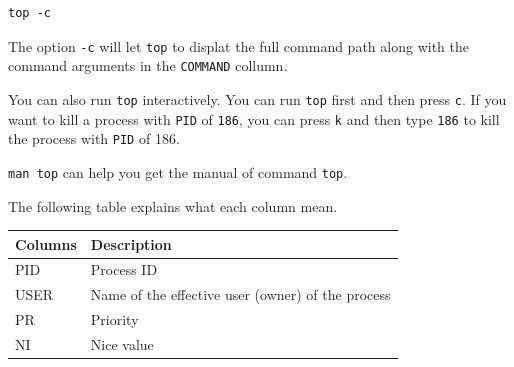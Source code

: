 \documentclass[]{book}
\begin{document}
\begin{verbatim}
top -c
\end{verbatim}

The option \texttt{-c} will let \texttt{top} to displat the full command path along with the command arguments in the \texttt{COMMAND} collumn.

You can also run \texttt{top} interactively. You can run \texttt{top} first and then press \texttt{c}. If you want to kill a process with \texttt{PID} of \texttt{186}, you can press \texttt{k} and then type \texttt{186} to kill the process with \texttt{PID} of 186.

\texttt{man\ top} can help you get the manual of command \texttt{top}.

The following table explains what each column mean.

\begin{longtable}[]{@{}ll@{}}
\toprule
\begin{minipage}[b]{0.05\columnwidth}\raggedright
Columns\strut
\end{minipage} & \begin{minipage}[b]{0.89\columnwidth}\raggedright
Description\strut
\end{minipage}\tabularnewline
\midrule
\endhead
\begin{minipage}[t]{0.05\columnwidth}\raggedright
PID\strut
\end{minipage} & \begin{minipage}[t]{0.89\columnwidth}\raggedright
Process ID\strut
\end{minipage}\tabularnewline
\begin{minipage}[t]{0.05\columnwidth}\raggedright
USER\strut
\end{minipage} & \begin{minipage}[t]{0.89\columnwidth}\raggedright
Name of the effective user (owner) of the process\strut
\end{minipage}\tabularnewline
\begin{minipage}[t]{0.05\columnwidth}\raggedright
PR\strut
\end{minipage} & \begin{minipage}[t]{0.89\columnwidth}\raggedright
Priority\strut
\end{minipage}\tabularnewline
\begin{minipage}[t]{0.05\columnwidth}\raggedright
NI\strut
\end{minipage} & \begin{minipage}[t]{0.89\columnwidth}\raggedright
Nice value\strut
\end{minipage}\tabularnewline

\end{longtable}
\end{document}
